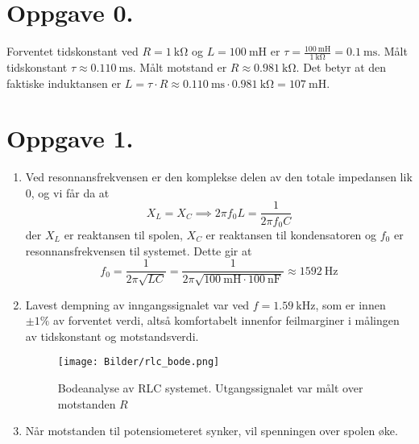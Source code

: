 \documentclass[a4paper,11pt,norsk]{article}
\begin{document}


\section*{Oppgave 0.}
Forventet tidskonstant ved $R = \SI{1}{\kilo\ohm}$ og $L = \SI{100}{\milli\henry}$ er $\tau = \frac{\SI{100}{\milli\henry}}{\SI{1}{\kilo\ohm}} = \SI{0.1}{\milli\s}$.
Målt tidskonstant $\tau \approx \SI{0.110}{\milli\s}$. Målt motstand er $R \approx \SI{0.981}{\kilo\ohm}$.
Det betyr at den faktiske induktansen er $L = \tau \cdot R \approx \SI{0.110}{\milli\s} \cdot \SI{0.981}{\kilo\ohm} = \SI{107}{\milli\henry}$.

\section*{Oppgave 1.}
\begin{enumerate}
    \item Ved resonnansfrekvensen er den komplekse delen av den totale impedansen lik 0, og vi får da at 
        \[
            X_L = X_C \implies 2\pi f_0 L = \frac{1}{2\pi f_0 C}
        \]
        der $X_L$ er reaktansen til spolen, $X_C$ er reaktansen til kondensatoren og $f_0$ er resonnansfrekvensen til systemet.
        Dette gir at 
        \[
            f_0 = \frac{1}{2\pi\sqrt{LC}} = \frac{1}{2\pi\sqrt{ \SI{100}{\milli\henry} \cdot \SI{100}{\nano\farad}}} \approx \SI{1592}{\hertz}
        \]
    \item Lavest dempning av inngangssignalet var ved $f = \SI{1.59}{\kilo\hertz}$, som er innen $\pm 1\%$ av forventet verdi, altså komfortabelt innenfor feilmarginer i 
        målingen av tidskonstant og motstandsverdi.
        \begin{figure}[H]
            \centering
            \texttt{[image: Bilder/rlc\_bode.png]}
            \caption{Bodeanalyse av RLC systemet. Utgangssignalet var målt over motstanden $R$}
        \end{figure}
    \item Når motstanden til potensiometeret synker, vil spenningen over spolen øke.
\end{enumerate}
\end{document}
